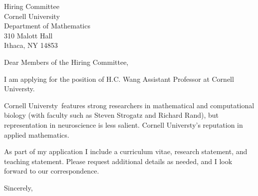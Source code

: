\documentclass[11pt,a4paper]{letter}
\begin{document}
\def\School{Cornell Universty}
\begin{letter}
{Hiring Committee\\
Cornell University\\
Department of Mathematics\\
310 Malott Hall\\
Ithaca, NY 14853}


\opening{Dear Members of the Hiring Committee,}

I am applying for the position of H.C. Wang Assistant Professor at \School. 



\School~features strong researchers in mathematical and computational biology (with faculty such as Steven Strogatz and Richard Rand), but representation in neuroscience is less salient. \School's  reputation in applied mathematics.



As part of my application I include a curriculum vitae, research statement, and teaching statement. Please request additional details as needed, and I look forward to our correspondence.

\closing{Sincerely,}
\end{letter}
\end{document}
